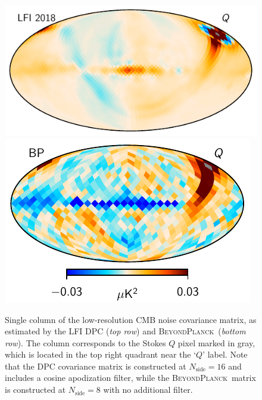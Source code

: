 \documentclass[twocolumn]{aa}
\newcommand{\BP}{\textsc{BeyondPlanck}}
\begin{document}
\begin{figure}[t]
  \center
  \includegraphics[width=\linewidth]{figs/ncov_dpc_pix100_Q.pdf}
  \includegraphics[width=\linewidth]{figs/ncov_pix100_BP10_Q.pdf}
  \caption{Single column of the low-resolution
    CMB noise covariance matrix, as estimated by the LFI DPC
    (\emph{top row}) and \BP\ (\emph{bottom row}). The column
    corresponds to the Stokes $Q$ pixel marked in gray, which is
    located in the top right quadrant near the `$Q$' label. Note that
    the DPC covariance matrix is constructed at $N_{\mathrm{side}}=16$
    and includes a cosine apodization filter, while the \BP\ matrix is
    constructed at $N_{\mathrm{side}}=8$ with no additional
    filter.}\label{fig:ncov}
\end{figure}
\end{document}

